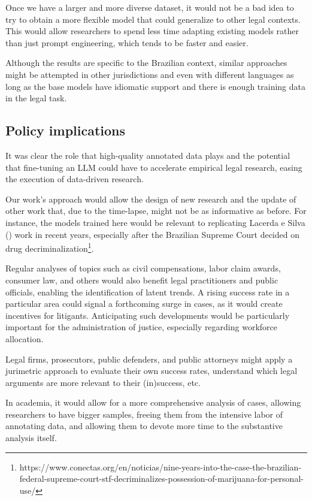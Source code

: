 \documentclass[
  12pt,
]{article}
\begin{document}
Once we have a larger and more diverse dataset, it would not be a bad
idea to try to obtain a more flexible model that could generalize to
other legal contexts. This would allow researchers to spend less time
adapting existing models rather than just prompt engineering, which
tends to be faster and easier.

Although the results are specific to the Brazilian context, similar
approaches might be attempted in other jurisdictions and even with
different languages as long as the base models have idiomatic support
and there is enough training data in the legal task.

\subsection{Policy implications}\label{policy-implications}

It was clear the role that high-quality annotated data plays and the
potential that fine-tuning an LLM could have to accelerate empirical
legal research, easing the execution of data-driven research.

Our work's approach would allow the design of new research and the
update of other work that, due to the time-lapse, might not be as
informative as before. For instance, the models trained here would be
relevant to replicating Lacerda e Silva
() work in recent
years, especially after the Brazilian Supreme Court decided on drug
decriminalization\footnote{https://www.conectas.org/en/noticias/nine-years-into-the-case-the-brazilian-federal-supreme-court-stf-decriminalizes-possession-of-marijuana-for-personal-use/}.

Regular analyses of topics such as civil compensations, labor claim
awards, consumer law, and others would also benefit legal practitioners
and public officials, enabling the identification of latent trends. A
rising success rate in a particular area could signal a forthcoming
surge in cases, as it would create incentives for litigants.
Anticipating such developments would be particularly important for the
administration of justice, especially regarding workforce allocation.

Legal firms, prosecutors, public defenders, and public attorneys might
apply a jurimetric approach to evaluate their own success rates,
understand which legal arguments are more relevant to their (in)success,
etc.

In academia, it would allow for a more comprehensive analysis of cases,
allowing researchers to have bigger samples, freeing them from the
intensive labor of annotating data, and allowing them to devote more
time to the substantive analysis itself.
\end{document}
